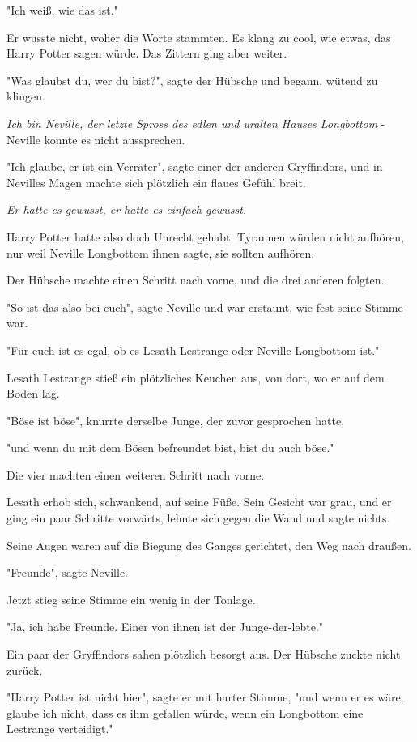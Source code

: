 {"Ich weiß, wie das ist."

Er wusste nicht, woher die Worte stammten. Es klang zu cool, wie etwas, das Harry Potter sagen würde. Das Zittern ging aber weiter.

"Was glaubst du, wer du bist?", sagte der Hübsche und begann, wütend zu klingen.

\emph{Ich bin Neville, der letzte Spross des edlen und uralten Hauses Longbottom} - Neville konnte es nicht aussprechen.

"Ich glaube, er ist ein Verräter", sagte einer der anderen Gryffindors, und in Nevilles Magen machte sich plötzlich ein flaues Gefühl breit.

\emph{Er hatte es gewusst, er hatte es einfach gewusst.}

Harry Potter hatte also doch Unrecht gehabt. Tyrannen würden nicht aufhören, nur weil Neville Longbottom ihnen sagte, sie sollten aufhören.

Der Hübsche machte einen Schritt nach vorne, und die drei anderen folgten.

"So ist das also bei euch", sagte Neville und war erstaunt, wie fest seine Stimme war.

"Für euch ist es egal, ob es Lesath Lestrange oder Neville Longbottom ist."

Lesath Lestrange stieß ein plötzliches Keuchen aus, von dort, wo er auf dem Boden lag.

"Böse ist böse", knurrte derselbe Junge, der zuvor gesprochen hatte,

"und wenn du mit dem Bösen befreundet bist, bist du auch böse."

Die vier machten einen weiteren Schritt nach vorne.

Lesath erhob sich, schwankend, auf seine Füße. Sein Gesicht war grau, und er ging ein paar Schritte vorwärts, lehnte sich gegen die Wand und sagte nichts.

Seine Augen waren auf die Biegung des Ganges gerichtet, den Weg nach draußen.

"Freunde", sagte Neville.

Jetzt stieg seine Stimme ein wenig in der Tonlage.

"Ja, ich habe Freunde. Einer von ihnen ist der Junge-der-lebte."

Ein paar der Gryffindors sahen plötzlich besorgt aus. Der Hübsche zuckte nicht zurück.

"Harry Potter ist nicht hier", sagte er mit harter Stimme, "und wenn er es wäre, glaube ich nicht, dass es ihm gefallen würde, wenn ein Longbottom eine Lestrange verteidigt."

}
